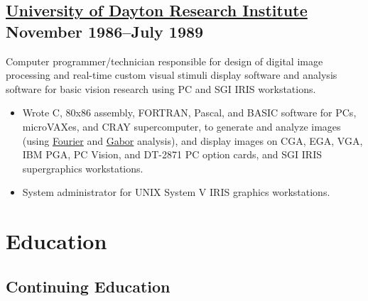 \documentclass[10pt,letterpaper,oneside]{report}
\begin{document}
\begin{minipage}{\textwidth}
  \subsection[University of Dayton Research Institute]{
    \href{http://www.udri.udayton.edu/AboutUDRI/}{University of Dayton Research Institute}
    \hfill
    November 1986--July 1989
  }

  Computer programmer/technician responsible for design of digital image
  processing and real-time custom visual stimuli display software and analysis
  software for basic vision research using PC and SGI IRIS workstations.

  \begin{itemize}
    \item Wrote C, 80x86 assembly, FORTRAN, Pascal, and BASIC software for PCs,
      microVAXes, and CRAY supercomputer, to generate and analyze images (using
      \href{http://en.wikipedia.org/wiki/Fourier_analysis}{Fourier} and
      \href{http://en.wikipedia.org/wiki/Gabor_transform}{Gabor} analysis), and
      display images on CGA, EGA, VGA, IBM PGA, PC Vision, and DT-2871 PC option
      cards, and SGI IRIS supergraphics workstations.

    \item System administrator for UNIX System V IRIS graphics workstations.
  \end{itemize}
\end{minipage}

\section{Education}

\subsection{Continuing Education}
\end{document}
